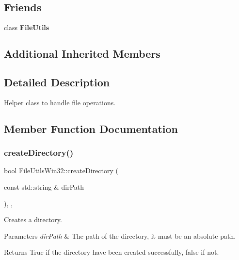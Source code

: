 \subsection*{Friends}
\begin{DoxyCompactItemize}
\item 
\mbox{\label{classFileUtilsWin32_ab3d3da2a9e626c1aae143a4f83d35bdf}} 
class {\bfseries File\+Utils}
\end{DoxyCompactItemize}
\subsection*{Additional Inherited Members}


\subsection{Detailed Description}
Helper class to handle file operations. 

\subsection{Member Function Documentation}
\mbox{\label{classFileUtilsWin32_a6385e7d4763147cff2c158974d16adf8}} 
\subsubsection{\texorpdfstring{create\+Directory()}{createDirectory()}\hspace{0.1cm}{\footnotesize\ttfamily [1/2]}}
{\footnotesize\ttfamily bool File\+Utils\+Win32\+::create\+Directory (\begin{DoxyParamCaption}\item[{const std\+::string \&}]{dir\+Path }\end{DoxyParamCaption})\hspace{0.3cm}{\ttfamily [override]}, {\ttfamily [protected]}, {\ttfamily [virtual]}}

Creates a directory.


\begin{DoxyParams}{Parameters}
{\em dir\+Path} & The path of the directory, it must be an absolute path. \\
\hline
\end{DoxyParams}
\begin{DoxyReturn}{Returns}
True if the directory have been created successfully, false if not. 
\end{DoxyReturn}


